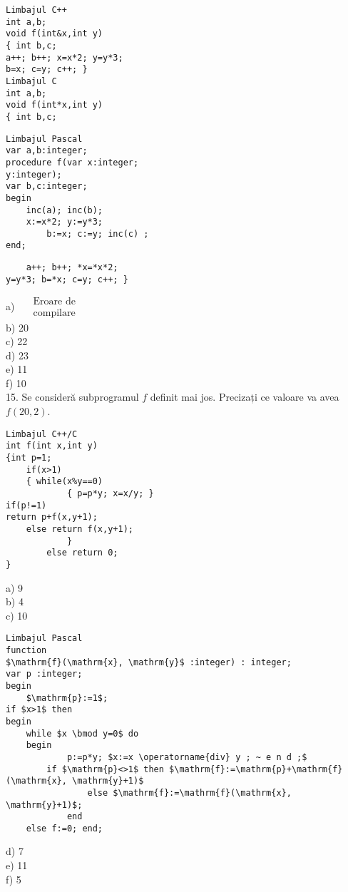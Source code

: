 \begin{verbatim}
Limbajul C++
int a,b;
void f(int&x,int y)
{ int b,c;
a++; b++; x=x*2; y=y*3;
b=x; c=y; c++; }
Limbajul C
int a,b;
void f(int*x,int y)
{ int b,c;
\end{verbatim}

\begin{verbatim}
Limbajul Pascal
var a,b:integer;
procedure f(var x:integer;
y:integer);
var b,c:integer;
begin
    inc(a); inc(b);
    x:=x*2; y:=y*3;
        b:=x; c:=y; inc(c) ;
end;
\end{verbatim}

\begin{verbatim}
    a++; b++; *x=*x*2;
y=y*3; b=*x; c=y; c++; }
\end{verbatim}

a) $\begin{aligned} & \text { Eroare de } \\ & \text { compilare }\end{aligned}$\\
b) 20\\
c) 22\\
d) 23\\
e) 11\\
f) 10\\
15. Se consideră subprogramul $f$ definit mai jos. Precizați ce valoare va avea $f(20,2)$.

\begin{verbatim}
Limbajul C++/C
int f(int x,int y)
{int p=1;
    if(x>1)
    { while(x%y==0)
            { p=p*y; x=x/y; }
if(p!=1)
return p+f(x,y+1);
    else return f(x,y+1);
            }
        else return 0;
}
\end{verbatim}

a) 9\\
b) 4\\
c) 10

\begin{verbatim}
Limbajul Pascal
function
$\mathrm{f}(\mathrm{x}, \mathrm{y}$ :integer) : integer;
var p :integer;
begin
    $\mathrm{p}:=1$;
if $x>1$ then
begin
    while $x \bmod y=0$ do
    begin
            p:=p*y; $x:=x \operatorname{div} y ; ~ e n d ;$
        if $\mathrm{p}<>1$ then $\mathrm{f}:=\mathrm{p}+\mathrm{f}(\mathrm{x}, \mathrm{y}+1)$
                else $\mathrm{f}:=\mathrm{f}(\mathrm{x}, \mathrm{y}+1)$;
            end
    else f:=0; end;
\end{verbatim}

d) 7\\
e) 11\\
f) 5

